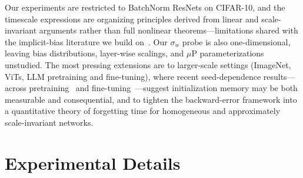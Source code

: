 \documentclass{article}
\newcommand{\pier}[1]{{\color{red} Pier: #1}}
\begin{document}
Our experiments are restricted to BatchNorm ResNets on CIFAR-10, and the
timescale expressions are organizing principles derived from linear and
scale-invariant arguments rather than full nonlinear
theorems---limitations shared with the implicit-bias literature we build
on~\citep{barrett2021implicit,smith2021origin,beneventano2023trajectories,
cattaneo2024implicit}.  Our $\sigma_w$ probe is also one-dimensional,
leaving bias distributions, layer-wise scalings, and $\mu$P
parameterizations unstudied.  The most pressing extensions are to
larger-scale settings (ImageNet, ViTs, LLM pretraining and
fine-tuning), where recent seed-dependence
results---across pretraining~\citep{vanderwal2025polypythias,fehlauer2025convergence,tong2026seedprints,li2026transformersborn}
and fine-tuning~\citep{dodge2020finetuning}---suggest initialization memory
may be both measurable and consequential, and to tighten the backward-error
framework into a quantitative theory of forgetting time for homogeneous and
approximately scale-invariant networks.








\appendix

\clearpage
\section{Experimental Details}
\label{app:experiments}
\end{document}
